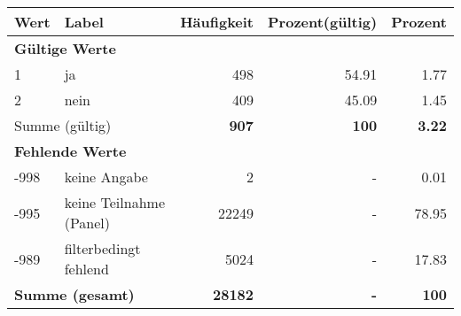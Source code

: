      \begin{longtable}{lXrrr}
     \toprule
     \textbf{Wert} & \textbf{Label} & \textbf{Häufigkeit} & \textbf{Prozent(gültig)} & \textbf{Prozent} \\
     \endhead
     \midrule
     \multicolumn{5}{l}{\textbf{Gültige Werte}}\\

     1 &
     \multicolumn{1}{X}{ ja   } &


       \num{498} &
       \num[round-mode=places,round-precision=2]{54.91} &
         \num[round-mode=places,round-precision=2]{1.77} \\

     2 &
     \multicolumn{1}{X}{ nein   } &


       \num{409} &
       \num[round-mode=places,round-precision=2]{45.09} &
         \num[round-mode=places,round-precision=2]{1.45} \\
     \midrule
     \multicolumn{2}{l}{Summe (gültig)} &
       \textbf{\num{907}} &
     \textbf{\num{100}} &
       \textbf{\num[round-mode=places,round-precision=2]{3.22}} \\
     \multicolumn{5}{l}{\textbf{Fehlende Werte}}\\
       -998 &
       keine Angabe &
         \num{2} &
        - &
         \num[round-mode=places,round-precision=2]{0.01} \\
       -995 &
       keine Teilnahme (Panel) &
         \num{22249} &
        - &
         \num[round-mode=places,round-precision=2]{78.95} \\
       -989 &
       filterbedingt fehlend &
         \num{5024} &
        - &
         \num[round-mode=places,round-precision=2]{17.83} \\
     \midrule
     \multicolumn{2}{l}{\textbf{Summe (gesamt)}} &
          \textbf{\num{28182}} &
        \textbf{-} &
        \textbf{\num{100}} \\
     \bottomrule
     \end{longtable}
     
